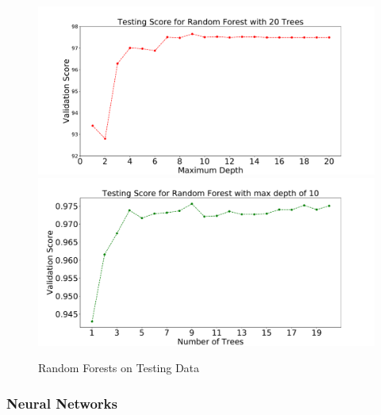 \begin{figure}[h]
\includegraphics[width=\twopicsp\textwidth]{depthvsscore_rf_10seeds_20trees.pdf}
\includegraphics[width=\twopicsp\textwidth]{treesvsscore_RF_10seeds_10maxdepth}
\caption{
Random Forests on Testing Data
}
\label{fig:Maps_data}
\end{figure}


\subsubsection{Neural Networks}

